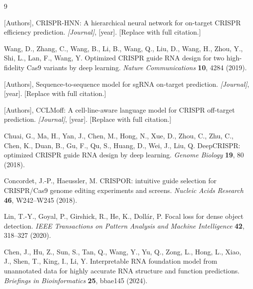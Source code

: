 \documentclass[11pt,a4paper]{article}
\begin{document}
\begin{thebibliography}{9}

[Authors], CRISPR-HNN: A hierarchical neural network for on-target CRISPR efficiency prediction. \emph{[Journal]}, [year]. [Replace with full citation.]

Wang, D., Zhang, C., Wang, B., Li, B., Wang, Q., Liu, D., Wang, H., Zhou, Y., Shi, L., Lan, F., Wang, Y. Optimized CRISPR guide RNA design for two high-fidelity Cas9 variants by deep learning. \emph{Nature Communications} \textbf{10}, 4284 (2019).

[Authors], Sequence-to-sequence model for sgRNA on-target prediction. \emph{[Journal]}, [year]. [Replace with full citation.]

[Authors], CCLMoff: A cell-line-aware language model for CRISPR off-target prediction. \emph{[Journal]}, [year]. [Replace with full citation.]

Chuai, G., Ma, H., Yan, J., Chen, M., Hong, N., Xue, D., Zhou, C., Zhu, C., Chen, K., Duan, B., Gu, F., Qu, S., Huang, D., Wei, J., Liu, Q. DeepCRISPR: optimized CRISPR guide RNA design by deep learning. \emph{Genome Biology} \textbf{19}, 80 (2018).

Concordet, J.-P., Haeussler, M. CRISPOR: intuitive guide selection for CRISPR/Cas9 genome editing experiments and screens. \emph{Nucleic Acids Research} \textbf{46}, W242--W245 (2018).

Lin, T.-Y., Goyal, P., Girshick, R., He, K., Doll\'{a}r, P. Focal loss for dense object detection. \emph{IEEE Transactions on Pattern Analysis and Machine Intelligence} \textbf{42}, 318--327 (2020).

Chen, J., Hu, Z., Sun, S., Tan, Q., Wang, Y., Yu, Q., Zong, L., Hong, L., Xiao, J., Shen, T., King, I., Li, Y. Interpretable RNA foundation model from unannotated data for highly accurate RNA structure and function predictions. \emph{Briefings in Bioinformatics} \textbf{25}, bbae145 (2024).

\end{thebibliography}
\end{document}
